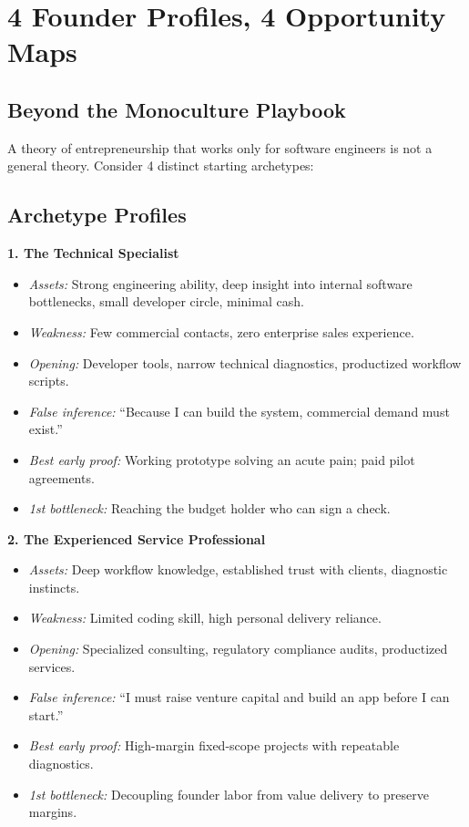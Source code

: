\section{4 Founder Profiles, 4 Opportunity Maps}

\subsection{Beyond the Monoculture Playbook}

A theory of entrepreneurship that works only for software engineers is not a general theory. Consider 4 distinct starting archetypes:

\subsection{Archetype Profiles}

\textbf{1. The Technical Specialist}
\begin{itemize}[leftmargin=11pt,itemsep=1pt,topsep=1pt,parsep=0pt]
  \item \textit{Assets:} Strong engineering ability, deep insight into internal software bottlenecks, small developer circle, minimal cash.
  \item \textit{Weakness:} Few commercial contacts, zero enterprise sales experience.
  \item \textit{Opening:} Developer tools, narrow technical diagnostics, productized workflow scripts.
  \item \textit{False inference:} ``Because I can build the system, commercial demand must exist.''
  \item \textit{Best early proof:} Working prototype solving an acute pain; paid pilot agreements.
  \item \textit{1st bottleneck:} Reaching the budget holder who can sign a check.
\end{itemize}

\textbf{2. The Experienced Service Professional}
\begin{itemize}[leftmargin=11pt,itemsep=1pt,topsep=1pt,parsep=0pt]
  \item \textit{Assets:} Deep workflow knowledge, established trust with clients, diagnostic instincts.
  \item \textit{Weakness:} Limited coding skill, high personal delivery reliance.
  \item \textit{Opening:} Specialized consulting, regulatory compliance audits, productized services.
  \item \textit{False inference:} ``I must raise venture capital and build an app before I can start.''
  \item \textit{Best early proof:} High-margin fixed-scope projects with repeatable diagnostics.
  \item \textit{1st bottleneck:} Decoupling founder labor from value delivery to preserve margins.
\end{itemize}


